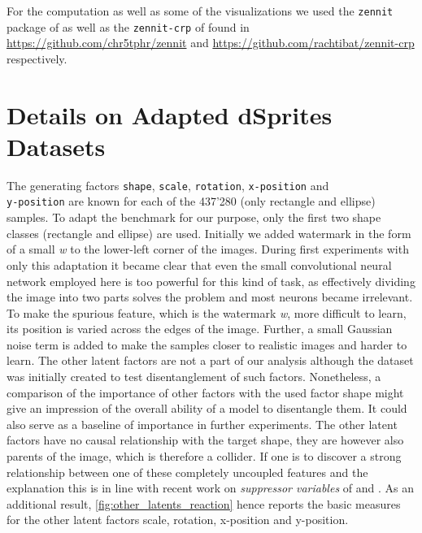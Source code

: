 For the computation as well as some of the visualizations we used the \verb|zennit| package of \cite{Anders2021} as well as the \verb|zennit-crp| of \cite{Achtibat2023} found in 
\url{https://github.com/chr5tphr/zennit} and \url{https://github.com/rachtibat/zennit-crp} respectively.

\section{Details on Adapted dSprites Datasets}\label{appendix:dsprites}

The generating factors \verb|shape|, \verb|scale|, \verb|rotation|, \verb|x-position| and \\
\verb|y-position| are known for each of the 437'280 (only rectangle and ellipse) samples. 
To adapt the benchmark for our purpose, only the first two shape classes (rectangle and ellipse) are used. 
Initially we added watermark in the form of a small \textit{w} to the lower-left corner of the images. During first experiments with only this adaptation it became clear that even the small convolutional neural network employed here is too powerful for this kind of task, as effectively dividing the image into two parts solves the problem and most neurons became irrelevant.
To make the spurious feature, which is the watermark \textit{w}, more difficult to learn, its position is varied across the edges of the image. Further, a small Gaussian noise term is added to make the samples closer to realistic images and harder to learn. The other latent factors are not a part of our analysis although the dataset was initially created to test disentanglement of such factors. Nonetheless, a comparison of the importance of other factors with the used factor shape might give an impression of the overall ability of a model to disentangle them. It could also serve as a baseline of importance in further experiments. The other latent factors have no causal relationship with the target shape, they are however also parents of the image, which is therefore a collider. If one is to discover a strong relationship between one of these completely uncoupled features and the explanation this is in line with recent work on \textit{suppressor variables} of  \citet{Wilming2023} and \citet{Clark2023}. As an additional result, \cref{fig:other_latents_reaction} hence reports the basic measures for the other latent factors scale, rotation, x-position and y-position. \\

